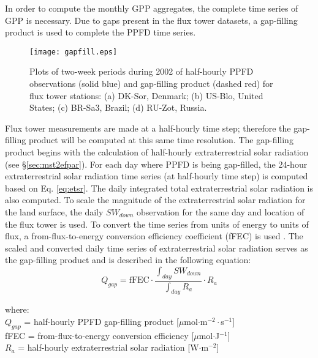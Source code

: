 In order to compute the monthly GPP aggregates, the complete time series of GPP is necessary.  
Due to gaps present in the flux tower datasets, a gap-filling product is used to complete the PPFD time series.
\begin{figure}[h!]
    \texttt{[image: gapfill.eps]}
    \caption{Plots of two-week periods during 2002 of half-hourly PPFD 
    observations (solid blue) and gap-filling product (dashed red) for flux 
    tower stations: (a) DK-Sor, Denmark; (b) US-Blo, United States; (c) BR-Sa3, 
    Brazil; (d) RU-Zot, Russia.}
    \label{fig:gapfill}
\end{figure}

Flux tower measurements are made at a half-hourly time step; therefore the gap-filling product will be computed at this same time resolution.  
The gap-filling product begins with the calculation of half-hourly extraterrestrial solar radiation (see \S \ref{sec:mst2efpar}).  
For each day where PPFD is being gap-filled, the 24-hour extraterrestrial solar radiation time series (at half-hourly time step) is computed based on Eq. \ref{eq:etsr}. 
The daily integrated total extraterrestrial solar radiation is also computed.  
To scale the magnitude of the extraterrestrial solar radiation for the land surface, the daily $SW_{down}$ observation for the same day and location of the flux tower is used.  
To convert the time series from units of energy to units of flux, a from-flux-to-energy conversion efficiency coefficient (fFEC) is used \parencite{ge11}. 
The scaled and converted daily time series of extraterrestrial solar radiation serves as the gap-filling product and is described in the following equation:
%
\begin{equation}
\label{eq:gapfill}
    Q_{gap} = \text{fFEC} \cdot 
              \frac{\int_{day} SW_{down}}{\int_{day} R_a} \cdot R_a
\end{equation}

\noindent where:\\
\indent $Q_{gap}$ = half-hourly PPFD gap-filling product [$\mu$mol$\cdot$m$^{-2}\cdot$s$^{-1}$]\\ 
\indent fFEC = from-flux-to-energy conversion efficiency [$\mu$mol$\cdot$J$^{-1}$]\\
\indent $R_a$ = half-hourly extraterrestrial solar radiation [W$\cdot$m$^{-2}$]\\

